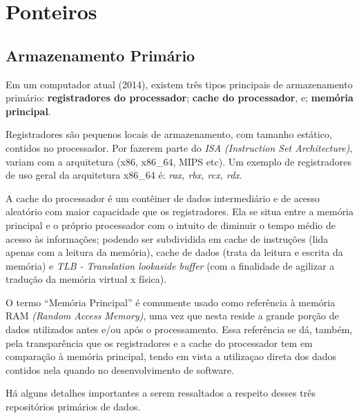 

\chapter{Ponteiros}

\section{Armazenamento Primário}

Em um computador atual (2014), existem três tipos principais de armazenamento primário: \textbf{registradores do processador}; \textbf{cache do processador}, e; \textbf{memória principal}.

Registradores são pequenos locais de armazenamento, com tamanho estático, contidos no processador. Por fazerem parte do \textit{ISA (Instruction Set Architecture)}, variam com a arquitetura (x86, x86\_64, MIPS etc). Um exemplo de registradores de uso geral da arquitetura x86\_64 é: \textit{rax, rbx, rcx, rdx}.

A cache do processador é um contêiner de dados intermediário e de acesso aleatório com maior capacidade que os registradores. Ela se situa entre a memória principal e o próprio processador com o intuito de diminuir o tempo médio de acesso às informações; podendo ser subdividida em cache de instruções (lida apenas com a leitura da memória), cache de dados (trata da leitura e escrita da memória) e \textit{TLB - Translation lookaside buffer} (com a finalidade de agilizar a tradução da memória virtual x física).

O termo ``Memória Principal'' é comumente usado como referência à memória RAM \textit{(Random Access Memory)}, uma vez que nesta reside a grande porção de dados utilizados antes e/ou após o processamento. Essa referência se dá, também, pela transparência que os registradores e a cache do processador tem em comparação à memória principal, tendo em vista a utilizaçao direta dos dados contidos nela quando no desenvolvimento de software.

Há alguns detalhes importantes a serem ressaltados a respeito desses três repositórios primários de dados.

